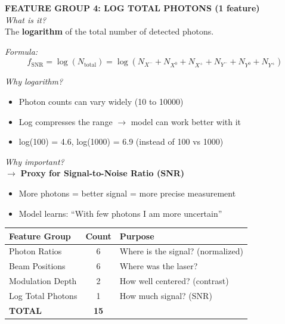 \documentclass[a4paper,10pt]{article}
\begin{document}
\begin{mdframed}[style=konzept]
\textbf{FEATURE GROUP 4: LOG TOTAL PHOTONS (1 feature)}\\[5pt]
\textit{What is it?}\\
The \textbf{logarithm} of the total number of detected photons.

\textit{Formula:}
$$f_{\text{SNR}} = \log(N_{\text{total}}) = \log(N_{X^-} + N_{X^0} + N_{X^+} + N_{Y^-} + N_{Y^0} + N_{Y^+})$$

\textit{Why logarithm?}
\begin{itemize}[leftmargin=*, nosep]
    \item Photon counts can vary widely (10 to 10000)
    \item Log compresses the range $\rightarrow$ model can work better with it
    \item log(100) = 4.6, log(1000) = 6.9 (instead of 100 vs 1000)
\end{itemize}

\textit{Why important?}\\
$\rightarrow$ \textbf{Proxy for Signal-to-Noise Ratio (SNR)}
\begin{itemize}[leftmargin=*, nosep]
    \item More photons = better signal = more precise measurement
    \item Model learns: ``With few photons I am more uncertain''
\end{itemize}
\end{mdframed}

\vspace{0.5cm}

\begin{center}
\begin{tabular}{|l|c|l|}
\hline
\textbf{Feature Group} & \textbf{Count} & \textbf{Purpose} \\
\hline
Photon Ratios & 6 & Where is the signal? (normalized) \\
Beam Positions & 6 & Where was the laser? \\
Modulation Depth & 2 & How well centered? (contrast) \\
Log Total Photons & 1 & How much signal? (SNR) \\
\hline
\textbf{TOTAL} & \textbf{15} & \\
\hline
\end{tabular}
\end{center}

\newpage

\end{document}
